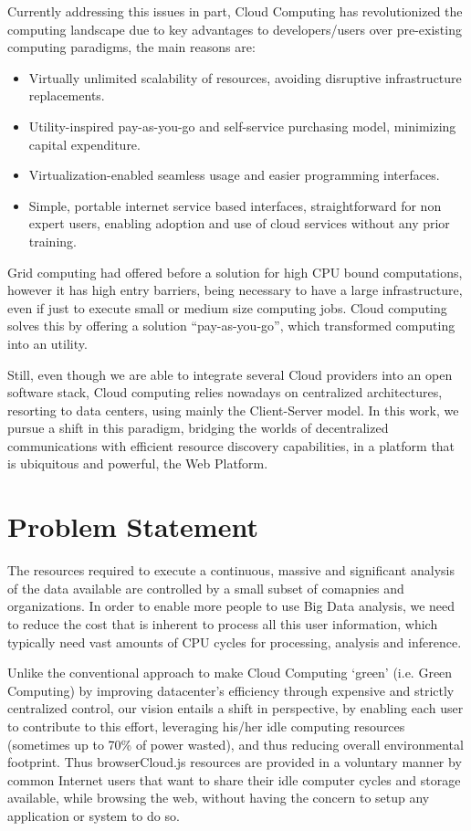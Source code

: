 Currently addressing this issues in part, Cloud Computing has revolutionized the computing landscape due to key advantages to developers/users over pre-existing computing paradigms, the main reasons are:

\begin{itemize}
    \item Virtually unlimited scalability of resources, avoiding disruptive infrastructure replacements.
    \item Utility-inspired pay-as-you-go and self-service purchasing model, minimizing capital expenditure.
    \item Virtualization-enabled seamless usage and easier programming interfaces.
    \item Simple, portable internet service based interfaces, straightforward for non expert users, enabling adoption and use of cloud services without any prior training.
\end{itemize}

Grid computing had offered before a solution for high CPU bound computations, however it has high entry barriers, being necessary to have a large infrastructure, even if just to execute small or medium size computing jobs. Cloud computing solves this by offering a solution ``pay-as-you-go'', which transformed computing into an utility.

Still, even though we are able to integrate several Cloud providers into an open software stack, Cloud computing relies nowadays on centralized architectures, resorting to data centers, using mainly the Client-Server model. In this work, we pursue a shift in this paradigm, bridging the worlds of decentralized communications with efficient resource discovery capabilities, in a platform that is ubiquitous and powerful, the Web Platform.

\section{Problem Statement}

The resources required to execute a continuous, massive and significant analysis of the data available are controlled by a small subset of comapnies and organizations. In order to enable more people to use Big Data analysis, we need to reduce the cost that is inherent to process all this user information, which typically need vast amounts of CPU cycles for processing, analysis and inference.

Unlike the conventional approach to make Cloud Computing `green' (i.e. Green Computing) by improving datacenter's efficiency through expensive and strictly centralized control, our vision entails a shift in perspective, by enabling each user to contribute to this effort, leveraging his/her idle computing resources (sometimes up to 70\% of power wasted), and thus reducing overall environmental footprint. Thus browserCloud.js resources are provided in a voluntary manner by common Internet users that want to share their idle computer cycles and storage available, while browsing the web, without having the concern to setup any application or system to do so.

